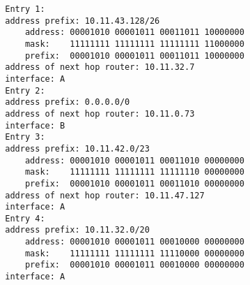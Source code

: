 \documentclass[10pt]{amsart}
\begin{document}
\begin{enumerate}
        \begin{verbatim}
        Entry 1:
        address prefix: 10.11.43.128/26
            address: 00001010 00001011 00011011 10000000
            mask:    11111111 11111111 11111111 11000000
            prefix:  00001010 00001011 00011011 10000000
        address of next hop router: 10.11.32.7
        interface: A
        Entry 2:
        address prefix: 0.0.0.0/0
        address of next hop router: 10.11.0.73
        interface: B
        Entry 3:
        address prefix: 10.11.42.0/23 
            address: 00001010 00001011 00011010 00000000
            mask:    11111111 11111111 11111110 00000000
            prefix:  00001010 00001011 00011010 00000000
        address of next hop router: 10.11.47.127
        interface: A
        Entry 4:
        address prefix: 10.11.32.0/20
            address: 00001010 00001011 00010000 00000000
            mask:    11111111 11111111 11110000 00000000
            prefix:  00001010 00001011 00010000 00000000
        interface: A
        \end{verbatim}
        

\end{enumerate}
\end{document}
